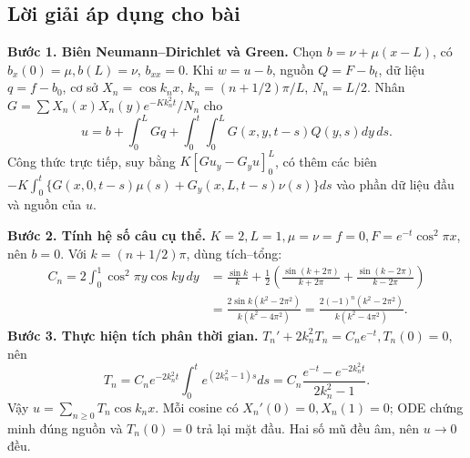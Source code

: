 \documentclass[10pt,a4paper]{article}
\begin{document}
\subsection*{Lời giải áp dụng cho bài}
\textbf{Bước 1. Biên Neumann–Dirichlet và Green.}
Chọn $b=\nu+\mu(x-L)$, có $b_x(0)=\mu,b(L)=\nu$, $b_{xx}=0$. Khi $w=u-b$, nguồn $Q=F-b_t$, dữ liệu $q=f-b_0$, cơ sở $X_n=\cos k_nx$, $k_n=(n+1/2)\pi/L$, $N_n=L/2$. Nhân $G=\sum X_n(x)X_n(y)e^{-Kk_n^2t}/N_n$ cho
\[u=b+\int_0^LGq+\int_0^t\!\int_0^LG(x,y,t-s)Q(y,s)dy\,ds.\]
Công thức trực tiếp, suy bằng $K[Gu_y-G_yu]_0^L$, có thêm các biên $-K\int_0^t\{G(x,0,t-s)\mu(s)+G_y(x,L,t-s)\nu(s)\}ds$ vào phần dữ liệu đầu và nguồn của $u$.

\textbf{Bước 2. Tính hệ số câu cụ thể.}
$K=2,L=1,\mu=\nu=f=0,F=e^{-t}\cos^2\pi x$, nên $b=0$. Với $k=(n+1/2)\pi$, dùng tích–tổng:
\begin{align*}
C_n=2\int_0^1\cos^2\pi y\cos ky\,dy
&=\frac{\sin k}k+\frac12\left(\frac{\sin(k+2\pi)}{k+2\pi}
+\frac{\sin(k-2\pi)}{k-2\pi}\right)\\
&=\frac{2\sin k(k^2-2\pi^2)}{k(k^2-4\pi^2)}
=\frac{2(-1)^n(k^2-2\pi^2)}{k(k^2-4\pi^2)}.
\end{align*}
\textbf{Bước 3. Thực hiện tích phân thời gian.}
$T_n'+2k_n^2T_n=C_ne^{-t},T_n(0)=0$, nên
\[T_n=C_ne^{-2k_n^2t}\int_0^te^{(2k_n^2-1)s}ds
=C_n\frac{e^{-t}-e^{-2k_n^2t}}{2k_n^2-1}.\]
Vậy $u=\sum_{n\ge0}T_n\cos k_nx$. Mỗi cosine có $X_n'(0)=0,X_n(1)=0$; ODE chứng minh đúng nguồn và $T_n(0)=0$ trả lại mặt đầu. Hai số mũ đều âm, nên $u\to0$ đều.
\end{document}
